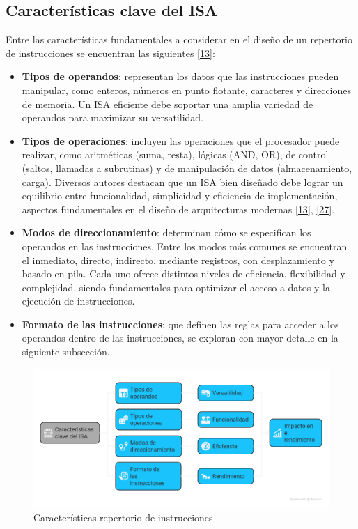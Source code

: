 \documentclass[12pt,oneside]{templates/unerthesis}
\providecommand{\tightlist}{%
  \setlength{\itemsep}{0pt}\setlength{\parskip}{0pt}}
\begin{document}
\hypertarget{caracteruxedsticas-clave-del-isa}{%
\subsection{Características clave del ISA}\label{caracteruxedsticas-clave-del-isa}}

Entre las características fundamentales a considerar en el diseño de un repertorio de instrucciones se encuentran las siguientes \protect\hyperlink{ref-hennessy2017computer}{{[}13{]}}:

\begin{itemize}
\tightlist
\item
  \textbf{Tipos de operandos}: representan los datos que las instrucciones pueden manipular, como enteros, números en punto flotante, caracteres y direcciones de memoria. Un ISA eficiente debe soportar una amplia variedad de operandos para maximizar su versatilidad.
\item
  \textbf{Tipos de operaciones}: incluyen las operaciones que el procesador puede realizar, como aritméticas (suma, resta), lógicas (AND, OR), de control (saltos, llamadas a subrutinas) y de manipulación de datos (almacenamiento, carga). Diversos autores destacan que un ISA bien diseñado debe lograr un equilibrio entre funcionalidad, simplicidad y eficiencia de implementación, aspectos fundamentales en el diseño de arquitecturas modernas \protect\hyperlink{ref-hennessy2017computer}{{[}13{]}}, \protect\hyperlink{ref-null_essentials_2023}{{[}27{]}}.
\item
  \textbf{Modos de direccionamiento}: determinan cómo se especifican los operandos en las instrucciones. Entre los modos más comunes se encuentran el inmediato, directo, indirecto, mediante registros, con desplazamiento y basado en pila. Cada uno ofrece distintos niveles de eficiencia, flexibilidad y complejidad, siendo fundamentales para optimizar el acceso a datos y la ejecución de instrucciones.
\item
  \textbf{Formato de las instrucciones}: que definen las reglas para acceder a los operandos dentro de las instrucciones, se exploran con mayor detalle en la siguiente subsección.
\end{itemize}

\begin{figure}

{\centering \includegraphics[width=1\linewidth]{images/isa} 

}

\caption{Características repertorio de instrucciones}\label{fig:repInstCaracteristicas}
\end{figure}
\end{document}
